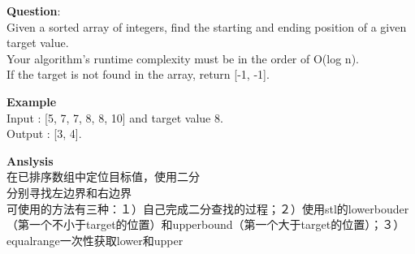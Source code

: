     
\begin{description}
    \item{\textbf{Question}}:\\%
		Given a sorted array of integers, find the starting and ending position of a given target value.\\
		Your algorithm's runtime complexity must be in the order of O(log n).\\
		If the target is not found in the array, return [-1, -1].\\

    \item{\textbf{Example}}\\
		Input : [5, 7, 7, 8, 8, 10] and target value 8.\\
		Output : [3, 4].\\

    \item{\textbf{Anslysis}}\\		
		在已排序数组中定位目标值，使用二分\\
		分别寻找左边界和右边界\\
		可使用的方法有三种：１）自己完成二分查找的过程；２）使用stl的lowerbouder（第一个不小于target的位置）和upperbound（第一个大于target的位置）；３）equalrange一次性获取lower和upper


\end{description}
